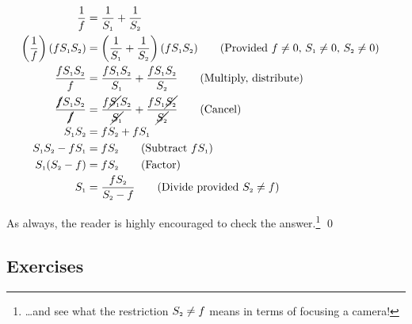 \begin{ex}
\begin{enumerate}
\begin{align*}
\dfrac{1}{f} & = \dfrac{1}{S_{\text{\tiny $1$}}} + \dfrac{1}{S_{\text{\tiny $2$}}} \\ 
\left(\dfrac{1}{f}\right)(fS_{\text{\tiny $1$}}S_{\text{\tiny $2$}}) & = \left(\dfrac{1}{S_{\text{\tiny $1$}}} + \dfrac{1}{S_{\text{\tiny $2$}}}\right) (fS_{\text{\tiny $1$}}S_{\text{\tiny $2$}}) \tag{Provided $f \neq 0$, $S_{\text{\tiny $1$}} \neq 0$, $S_{\text{\tiny $2$}}\neq 0$} \\ 
\dfrac{fS_{\text{\tiny $1$}}S_{\text{\tiny $2$}}}{f} & = \dfrac{fS_{\text{\tiny $1$}}S_{\text{\tiny $2$}}}{S_{\text{\tiny $1$}}} + \dfrac{fS_{\text{\tiny $1$}}S_{\text{\tiny $2$}}}{S_{\text{\tiny $2$}}} \tag{Multiply, distribute} \\ 
\dfrac{\cancel{f}S_{\text{\tiny $1$}}S_{\text{\tiny $2$}}}{\cancel{f}} & = \dfrac{f\cancel{S_{\text{\tiny $1$}}}S_{\text{\tiny $2$}}}{\cancel{S_{\text{\tiny $1$}}}} + \dfrac{fS_{\text{\tiny $1$}}\cancel{S_{\text{\tiny $2$}}}}{\cancel{S_{\text{\tiny $2$}}}} \tag{Cancel} \\ 
S_{\text{\tiny $1$}}S_{\text{\tiny $2$}} & = f S_{\text{\tiny $2$}} + fS_{\text{\tiny $1$}} & \\ 
S_{\text{\tiny $1$}}S_{\text{\tiny $2$}}  - fS_{\text{\tiny $1$}} & = f S_{\text{\tiny $2$}}   \tag{Subtract $fS_{\text{\tiny $1$}}$} \\ 
S_{\text{\tiny $1$}}(S_{\text{\tiny $2$}} - f) & = f S_{\text{\tiny $2$}} \tag{Factor}  \\ 
S_{\text{\tiny $1$}} & = \dfrac{f S_{\text{\tiny $2$}}}{S_{\text{\tiny $2$}} - f} \tag{Divide provided  $S_{\text{\tiny $2$}} \neq f$}  \\
\end{align*}

As always, the reader is highly encouraged to check the answer.\footnote{\ldots and see what the restriction $S_{\text{\tiny $2$}} \neq f$ means in terms of focusing a camera!}  \qed

\end{enumerate}

\end{ex}

\clearpage

\subsection{Exercises}



\closegraphsfile